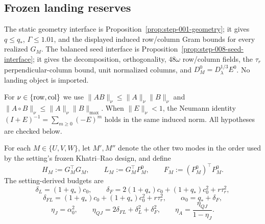 \subsection{Frozen landing reserves}\label{app:step-009}

The static geometry interface is Proposition~\ref{prop:step-001-geometry}; it
gives \(q\le q_*\), \(\Gamma\le1.01\), and the displayed induced row/column
Gram bounds for every realized \(G_M\). The balanced seed interface is
Proposition~\ref{prop:step-008-seed-interface}; it gives the decomposition,
orthogonality, \(48\omega\) row/column fields, the \(\tau_r\)
perpendicular-column bound, unit normalized columns, and
\(D_M^0=D_\lambda^{1/3}E^0\). No landing object is imported.

For $\nu\in\{{\rm row},{\rm col}\}$ we use
$\|AB\|_\nu\le\|A\|_\nu\|B\|_\nu$ and
$\|A\circ B\|_\nu\le\|A\|_\nu\|B\|_{\max}$. When $\|E\|_\nu<1$, the
Neumann identity $(I+E)^{-1}=\sum_{m\ge0}(-E)^m$ holds in the same induced
norm. All hypotheses are checked below.

For each \(M\in\{U,V,W\}\), let \(M',M''\) denote the other two modes in
the order used by the setting's frozen Khatri--Rao design, and define
\[
 H_M:=G_M^\top G_M,\qquad
 L_M:=G_M^\top P_M^0,\qquad
 F_M:=(P_M^0)^\top P_M^0.
\]
The setting-derived budgets are
\[
\delta_L=(1+q_*)c_0,\qquad
\delta_F=2(1+q_*)c_0+(1+q_*)c_0^2+r\tau_r^2,
\]
\[
\delta_{FL}=(1+q_*)c_0+(1+q_*)c_0^2+r\tau_r^2,\qquad
\alpha_0=q_*+\delta_F,
\]
\[
\eta_J=\alpha_0^2,\qquad
\eta_{QJ}=2\delta_{FL}+\delta_L^2+\delta_F^2,\qquad
\eta_A=\frac{\eta_{QJ}}{1-\eta_J}.
\]


